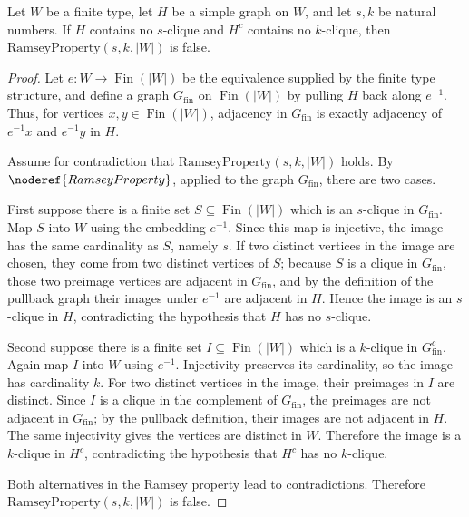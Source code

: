 \begin{helper}
Let \(W\) be a finite type, let \(H\) be a simple graph on \(W\), and let
\(s,k\) be natural numbers.  If \(H\) contains no \(s\)-clique and
\(H^{c}\) contains no \(k\)-clique, then
\(\mathrm{RamseyProperty}(s,k,|W|)\) is false.
\end{helper}
\begin{proof}
Let \(e:W\to \operatorname{Fin}(|W|)\) be the equivalence supplied by the
finite type structure, and define a graph \(G_{\operatorname{fin}}\) on
\(\operatorname{Fin}(|W|)\) by pulling \(H\) back along \(e^{-1}\).  Thus, for
vertices \(x,y\in \operatorname{Fin}(|W|)\), adjacency in
\(G_{\operatorname{fin}}\) is exactly adjacency of \(e^{-1}x\) and
\(e^{-1}y\) in \(H\).

Assume for contradiction that
\(\mathrm{RamseyProperty}(s,k,|W|)\) holds.  By
\(\noderef{RamseyProperty}\), applied to the graph \(G_{\operatorname{fin}}\),
there are two cases.

First suppose there is a finite set \(S\subseteq \operatorname{Fin}(|W|)\)
which is an \(s\)-clique in \(G_{\operatorname{fin}}\).  Map \(S\) into \(W\)
using the embedding \(e^{-1}\).  Since this map is injective, the image has
the same cardinality as \(S\), namely \(s\).  If two distinct vertices in the
image are chosen, they come from two distinct vertices of \(S\); because \(S\)
is a clique in \(G_{\operatorname{fin}}\), those two preimage vertices are
adjacent in \(G_{\operatorname{fin}}\), and by the definition of the pullback
graph their images under \(e^{-1}\) are adjacent in \(H\).  Hence the image is
an \(s\)-clique in \(H\), contradicting the hypothesis that \(H\) has no
\(s\)-clique.

Second suppose there is a finite set \(I\subseteq \operatorname{Fin}(|W|)\)
which is a \(k\)-clique in \(G_{\operatorname{fin}}^{c}\).  Again map \(I\)
into \(W\) using \(e^{-1}\).  Injectivity preserves its cardinality, so the
image has cardinality \(k\).  For two distinct vertices in the image, their
preimages in \(I\) are distinct.  Since \(I\) is a clique in the complement of
\(G_{\operatorname{fin}}\), the preimages are not adjacent in
\(G_{\operatorname{fin}}\); by the pullback definition, their images are not
adjacent in \(H\).  The same injectivity gives the vertices are distinct in
\(W\).  Therefore the image is a \(k\)-clique in \(H^{c}\), contradicting the
hypothesis that \(H^{c}\) has no \(k\)-clique.

Both alternatives in the Ramsey property lead to contradictions.  Therefore
\(\mathrm{RamseyProperty}(s,k,|W|)\) is false.
\end{proof}
